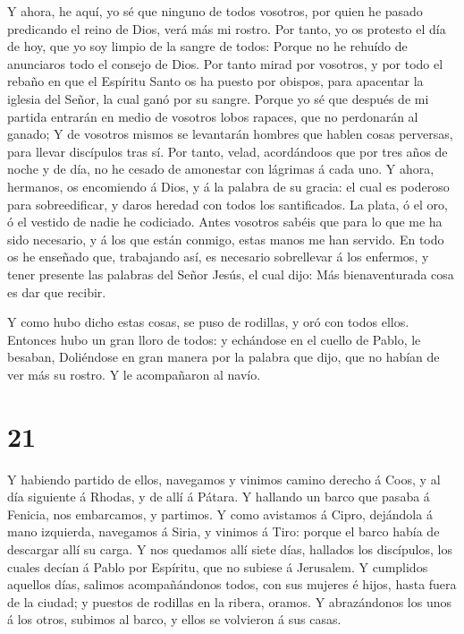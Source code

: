  Y ahora, he aquí, yo sé que ninguno de todos vosotros, por
quien he pasado predicando el reino de Dios, verá más mi rostro.
 Por tanto, yo os protesto el día de hoy, que yo soy limpio
de la sangre de todos:  Porque no he rehuído de anunciaros
todo el consejo de Dios.  Por tanto mirad por vosotros, y
por todo el rebaño en que el Espíritu Santo os ha puesto por obispos,
para apacentar la iglesia del Señor, la cual ganó por su sangre.
 Porque yo sé que después de mi partida entrarán en medio
de vosotros lobos rapaces, que no perdonarán al ganado;  Y
de vosotros mismos se levantarán hombres que hablen cosas perversas,
para llevar discípulos tras sí.  Por tanto, velad,
acordándoos que por tres años de noche y de día, no he cesado de
amonestar con lágrimas á cada uno.  Y ahora, hermanos, os
encomiendo á Dios, y á la palabra de su gracia: el cual es poderoso para
sobreedificar, y daros heredad con todos los santificados. 
La plata, ó el oro, ó el vestido de nadie he codiciado. 
Antes vosotros sabéis que para lo que me ha sido necesario, y á los que
están conmigo, estas manos me han servido.  En todo os he
enseñado que, trabajando así, es necesario sobrellevar á los enfermos, y
tener presente las palabras del Señor Jesús, el cual dijo: Más
bienaventurada cosa es dar que recibir.

 Y como hubo dicho estas cosas, se puso de rodillas, y oró
con todos ellos.  Entonces hubo un gran lloro de todos: y
echándose en el cuello de Pablo, le besaban,  Doliéndose en
gran manera por la palabra que dijo, que no habían de ver más su rostro.
Y le acompañaron al navío.

\hypertarget{section-20}{%
\section{21}\label{section-20}}

 Y habiendo partido de ellos, navegamos y vinimos camino
derecho á Coos, y al día siguiente á Rhodas, y de allí á Pátara.
 Y hallando un barco que pasaba á Fenicia, nos embarcamos, y
partimos.  Y como avistamos á Cipro, dejándola á mano
izquierda, navegamos á Siria, y vinimos á Tiro: porque el barco había de
descargar allí su carga.  Y nos quedamos allí siete días,
hallados los discípulos, los cuales decían á Pablo por Espíritu, que no
subiese á Jerusalem.  Y cumplidos aquellos días, salimos
acompañándonos todos, con sus mujeres é hijos, hasta fuera de la ciudad;
y puestos de rodillas en la ribera, oramos.  Y abrazándonos
los unos á los otros, subimos al barco, y ellos se volvieron á sus
casas.


